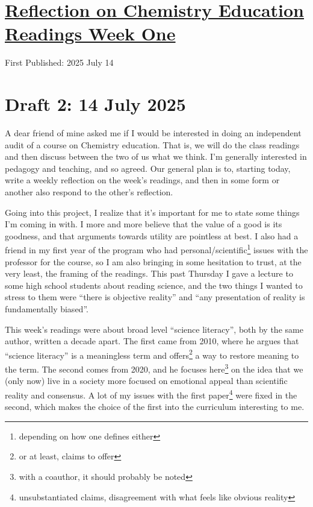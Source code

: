 \documentclass[12pt]{article}
\newcommand{\say}[1]{``#1''}
\renewcommand{\,}{\textsuperscript{,}}
\begin{document}
  
\doublespacing  
\section{\href{chemistry-education-research-1.html}{Reflection on Chemistry Education Readings Week One}}  
First Published: 2025 July 14

\section{Draft 2: 14 July 2025}

A dear friend of mine asked me if I would be interested in doing an independent audit of a course on Chemistry education.  
That is, we will do the class readings and then discuss between the two of us what we think.  
I'm generally interested in pedagogy and teaching, and so agreed.  
Our general plan is to, starting today, write a weekly reflection on the week's readings, and then in some form or another also respond to the other's reflection.

Going into this project, I realize that it's important for me to state some things I'm coming in with.  
I more and more believe that the value of a good is its goodness, and that arguments towards utility are pointless at best.  
I also had a friend in my first year of the program who had personal/scientific\footnote{depending on how one defines either} issues with the professor for the course, so I am also bringing in some hesitation to trust, at the very least, the framing of the readings.  
This past Thursday I gave a lecture to some high school students about reading science, and the two things I wanted to stress to them were \say{there is objective reality} and \say{any presentation of reality is fundamentally biased}.

This week's readings were about broad level \say{science literacy}, both by the same author, written a decade apart.  
The first came from 2010, where he argues that \say{science literacy} is a meaningless term and offers\footnote{or at least, claims to offer} a way to restore meaning to the term.  
The second comes from 2020, and he focuses here\footnote{with a coauthor, it should probably be noted} on the idea that we (only now) live in a society more focused on emotional appeal than scientific reality and consensus.  
A lot of my issues with the first paper\footnote{unsubstantiated claims, disagreement with what feels like obvious reality} were fixed in the second, which makes the choice of the first into the curriculum interesting to me.
\end{document}
